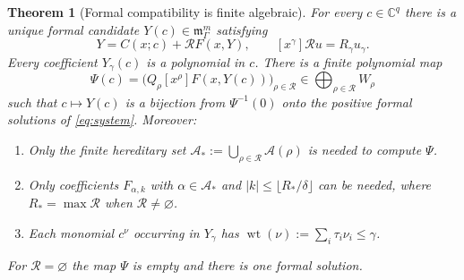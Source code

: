 \documentclass[11pt,a4paper]{article}
\numberwithin{equation}{section}
\newtheorem{theorem}{Theorem}[section]
\theoremstyle{definition}
\theoremstyle{remark}
\newcommand{\C}{\mathbb C}
\newcommand{\G}{\Gamma}
\newcommand{\mm}{\mathfrak m}
\newcommand{\Res}{\mathcal R}
\newcommand{\Anc}{\mathcal A}
\newcommand{\wt}{\operatorname{wt}}
\begin{document}
\begin{theorem}[Formal compatibility is finite algebraic]
\label{thm:formal}
For every $c\in\C^q$ there is a unique formal candidate
$Y(c)\in\mm_\G^m$ satisfying
\begin{equation}\label{eq:candidate}
 Y=C(x;c)+\mathscr R F(x,Y),
 \qquad [x^\gamma]\mathscr R u=R_\gamma u_\gamma.
\end{equation}
Every coefficient $Y_\gamma(c)$ is a polynomial in $c$. There is a finite
polynomial map
\begin{equation}\label{eq:Psi}
 \Psi(c)=\bigl(Q_\rho[x^\rho]F(x,Y(c))\bigr)_{\rho\in\Res}
       \in\bigoplus_{\rho\in\Res}W_\rho
\end{equation}
such that $c\mapsto Y(c)$ is a bijection from $\Psi^{-1}(0)$ onto the
positive formal solutions of \eqref{eq:system}. Moreover:

\begin{enumerate}
\item Only the finite hereditary set
$\Anc_*:=\bigcup_{\rho\in\Res}\Anc(\rho)$ is needed to compute $\Psi$.
\item Only coefficients $F_{\alpha,k}$ with $\alpha\in\Anc_*$ and
$|k|\leq\lfloor R_*/\delta\rfloor$ can be needed, where
$R_*=\max\Res$ when $\Res\ne\varnothing$.
\item Each monomial $c^\nu$ occurring in $Y_\gamma$ has
$\wt(\nu):=\sum_i\tau_i\nu_i\leq\gamma$.
\end{enumerate}
For $\Res=\varnothing$ the map $\Psi$ is empty and there is one formal
solution.
\end{theorem}
\end{document}
